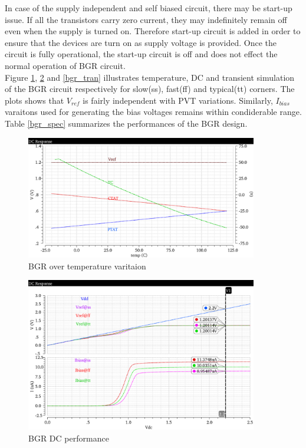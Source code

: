 \documentclass[12pt,a4paper,UKenglish]{article}
\begin{document}
In case of the supply independent and self biased circuit, there may be start-up issue. If all the transistors carry zero current, they may indefinitely remain off even when the supply is turned on. Therefore start-up circuit is added in order to ensure that the devices are turn on as supply voltage is provided. Once the circuit is fully operational, the start-up circuit is off and does not effect the normal operation of BGR circuit. \\

Figure  \ref{bgr_temp}, \ref{bgr_dc} and \ref{bgr_tran} illustrates temperature, DC and transient simulation of the BGR circuit respectively for slow(ss), fast(ff) and typical(tt) corners. The plots shows that $V_{ref}$ is fairly independent with PVT variations. Similarly, $I_{bias}$ varaitons used for generating the bias voltages remains within condiderable range. Table \ref{bgr_spec} summarizes the performances of the BGR design. 

\begin{figure}[htbp] %
   \centering
   \includegraphics[width=0.9\textwidth]{img/bgr_temp.pdf} 
   \caption{BGR over temperature varitaion}
   \label{bgr_temp}
\end{figure}

\begin{figure}[htbp] %
   \centering
   \includegraphics[width=0.9\textwidth]{img/bgr_dc.pdf} 
   \caption{BGR DC performance}
   \label{bgr_dc}
\end{figure}
\end{document}
